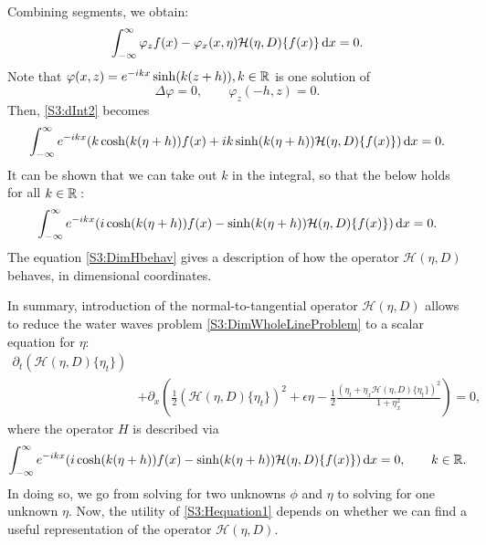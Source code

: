 Combining segments, we obtain: 
\begin{equation}\label{S3:dInt2}
\int_{-\infty}^{\infty} \varphi_z f(x) -\varphi_x(x, \eta) \mathcal{H}( \eta, D)\{ f(x) \} \,\mathrm{d} x = 0.
\end{equation}
Note that $\varphi(x,z) = e^{-ikx} \sinh(k(z+h)), k \in \mathbb R$ is one solution of 
\[ \Delta \varphi = 0, \qquad \varphi_z(-h,z) = 0.\]
Then, \eqref{S3:dInt2} becomes
\begin{align*}
\int_{-\infty}^{\infty} e^{-ikx}( k \cosh(k(\eta+h)) f(x) + ik \sinh(k(\eta+h)) \mathcal{H}( \eta, D)\{ f(x) \}) \,\mathrm{d} x = 0.
\end{align*}
It can be shown that we can take out $k$ in the integral, so that the below holds for all $k \in \mathbb R:$
\begin{equation}\label{S3:DimHbehav}
\int_{-\infty}^{\infty} e^{-ikx}( i  \cosh(k(\eta+h)) f(x) - \sinh(k(\eta+h)) \mathcal{H}( \eta, D)\{ f(x) \}) \,\mathrm{d} x = 0.
\end{equation}
The equation \eqref{S3:DimHbehav} gives a description of how the operator $\mathcal{H}( \eta, D)$ behaves, in dimensional coordinates. 

In summary, introduction of the normal-to-tangential operator $\mathcal{H}(\eta, D)$ allows to reduce the water waves problem \eqref{S3:DimWholeLineProblem} to a scalar equation for $\eta:$
\begin{equation}\label{S3:Hequation1}
\begin{aligned}
\partial_t\left(\mathcal{H}(\eta, D)\{ \eta_t\} \right) \\
&+ \partial_x\left( \frac{1}{2}\left(\mathcal{H}(\eta, D)\{\eta_t\} \right)^2 + \epsilon \eta - \frac{1}{2} \frac{(\eta_t + \eta_x \mathcal{H}(\eta, D)\{ \eta_t\})^2}{1+\eta_x^2}\right) = 0,
\end{aligned}
\end{equation}
where the operator $H$ is described via 
\begin{equation}\label{S3:DimHbehav1}
\int_{-\infty}^{\infty} e^{-ikx}( i  \cosh(k(\eta+h)) f(x) - \sinh(k(\eta+h)) \mathcal{H}( \eta, D)\{ f(x) \}) \,\mathrm{d} x = 0, \qquad k \in \mathbb R.
\end{equation}
In doing so, we go from solving for two unknowns $\phi$ and $\eta$ to solving for one unknown $\eta.$ Now, the utility of \eqref{S3:Hequation1} depends on whether we can find a useful representation of the operator $\mathcal{H}(\eta, D).$ 

